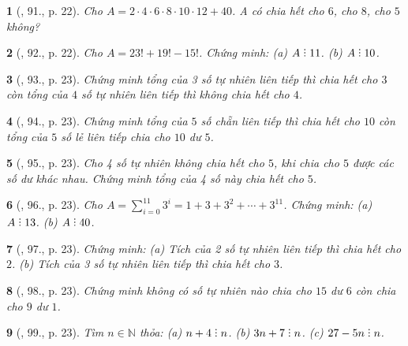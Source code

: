 \documentclass{article}
\newtheorem{baitoan}{}
\DeclareRobustCommand{\divby}{%
	\mathrel{\vbox{\baselineskip.65ex\lineskiplimit0pt\hbox{.}\hbox{.}\hbox{.}}}%
}
\begin{document}
\begin{baitoan}[\cite{Tuyen_Toan_6}, 91., p. 22]
	Cho $A = 2\cdot4\cdot6\cdot8\cdot10\cdot12 + 40$. A có chia hết cho $6$, cho $8$, cho $5$ không?
\end{baitoan}

\begin{baitoan}[\cite{Tuyen_Toan_6}, 92., p. 22]
	Cho $A = 23! + 19! - 15!$. Chứng minh: (a) $A\divby11$. (b) $A\divby10$.
\end{baitoan}

\begin{baitoan}[\cite{Tuyen_Toan_6}, 93., p. 23]
	Chứng minh tổng của 3 số tự nhiên liên tiếp thì chia hết cho $3$ còn tổng của $4$ số tự nhiên liên tiếp thì không chia hết cho $4$.
\end{baitoan}

\begin{baitoan}[\cite{Tuyen_Toan_6}, 94., p. 23]
	Chứng minh tổng của $5$ số chẵn liên tiếp thì chia hết cho $10$ còn tổng của $5$ số lẻ liên tiếp chia cho $10$ dư $5$.
\end{baitoan}

\begin{baitoan}[\cite{Tuyen_Toan_6}, 95., p. 23]
	Cho 4 số tự nhiên không chia hết cho $5$, khi chia cho $5$ được các số dư khác nhau. Chứng minh tổng của 4 số này chia hết cho $5$.
\end{baitoan}

\begin{baitoan}[\cite{Tuyen_Toan_6}, 96., p. 23]
	Cho $A = \sum_{i=0}^{11} 3^i = 1 + 3 + 3^2 + \cdots + 3^{11}$. Chứng minh: (a) $A\divby13$. (b) $A\divby40$.
\end{baitoan}

\begin{baitoan}[\cite{Tuyen_Toan_6}, 97., p. 23]
	Chứng minh: (a) Tích của 2 số tự nhiên liên tiếp thì chia hết cho $2$. (b) Tích của 3 số tự nhiên liên tiếp thì chia hết cho $3$.
\end{baitoan}

\begin{baitoan}[\cite{Tuyen_Toan_6}, 98., p. 23]
	Chứng minh không có số tự nhiên nào chia cho $15$ dư $6$ còn chia cho $9$ dư $1$.
\end{baitoan}

\begin{baitoan}[\cite{Tuyen_Toan_6}, 99., p. 23]
	Tìm $n\in\mathbb{N}$ thỏa: (a) $n + 4\divby n$. (b) $3n + 7\divby n$. (c) $27 - 5n\divby n$.
\end{baitoan}
\end{document}
